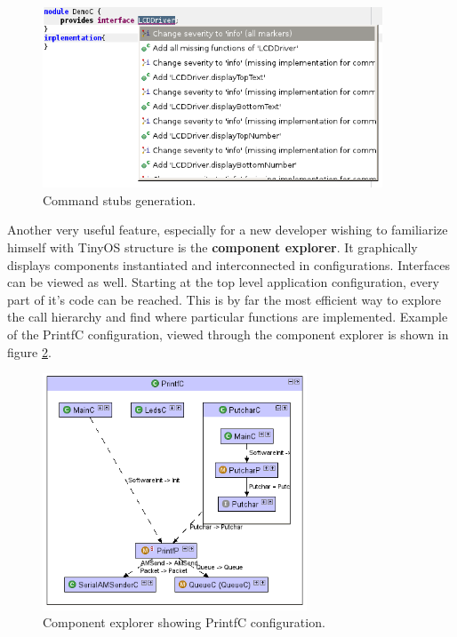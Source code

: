\begin{figure}[h]
  \centering
  \includegraphics[width=0.9\textwidth]{img/eclipse_compl6.png}
  \caption{Command stubs generation.}
  \label{fig:last_compl}
\end{figure}

Another very useful feature, especially for a new developer wishing to
familiarize himself with TinyOS structure is the {\bf component
explorer}. It graphically displays components instantiated and
interconnected in configurations. Interfaces can be viewed as well.
Starting at the top level application configuration, every part of
it's code can be reached. This is by far the most efficient way to
explore the call hierarchy and find where particular functions are
implemented. Example of the PrintfC configuration, viewed through
the component explorer is shown in figure
\ref{fig:eclipse_compexp}.

\begin{figure}[h]
  \centering
  \includegraphics[width=0.7\textwidth]{img/eclipse_compexp.png}
  \caption{Component explorer showing PrintfC configuration.}
  \label{fig:eclipse_compexp}
\end{figure}

